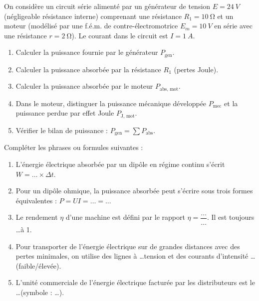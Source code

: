 \documentclass[11pt]{article}
\begin{document}
\begin{exercice}
On considère un circuit série alimenté par un générateur de tension $E = \SI{24}{V}$ (négligeable résistance interne) comprenant une résistance $R_1 = \SI{10}{\ohm}$ et un moteur (modélisé par une f.é.m. de contre-électromotrice $E_m = \SI{10}{V}$ en série avec une résistance $r = \SI{2}{\ohm}$). Le courant dans le circuit est $I = \SI{1}{A}$.
\begin{enumerate}
    \item Calculer la puissance fournie par le générateur $P_{\text{gen}}$.
    \item Calculer la puissance absorbée par la résistance $R_1$ (pertes Joule).
    \item Calculer la puissance absorbée par le moteur $P_{\text{abs, mot}}$.
    \item Dans le moteur, distinguer la puissance mécanique développée $P_{\text{mec}}$ et la puissance perdue par effet Joule $P_{\text{J, mot}}$.
    \item Vérifier le bilan de puissance : $P_{\text{gen}} = \sum P_{\text{abs}}$.
\end{enumerate}
\end{exercice}

\begin{exercice}
Compléter les phrases ou formules suivantes :
\begin{enumerate}
    \item L'énergie électrique absorbée par un dipôle en régime continu s'écrit $W = \ldots \times \Delta t$.
    \item Pour un dipôle ohmique, la puissance absorbée peut s'écrire sous trois formes équivalentes : $P = U I = \ldots = \ldots$
    \item Le rendement $\eta$ d'une machine est défini par le rapport $\eta = \dfrac{\ldots}{\ldots}$. Il est toujours \ldots à 1.
    \item Pour transporter de l'énergie électrique sur de grandes distances avec des pertes minimales, on utilise des lignes à \ldots tension et des courants d'intensité \ldots (faible/élevée).
    \item L'unité commerciale de l'énergie électrique facturée par les distributeurs est le \ldots (symbole : \ldots).
\end{enumerate}
\end{exercice}
\end{document}
